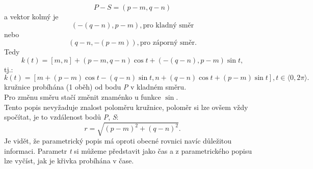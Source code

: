 	$$P-S = (p-m, q-n)$$
	a vektor kolmý je
	$$(-(q-n), p-m), \text{pro kladný směr}$$
	nebo
	$$(q-n, -(p-m)), \text{pro záporný směr}.$$
	Tedy
	$$k(t)=[m, n] + (p-m, q-n)\cos{t} + (-(q-n), p-m)\sin{t}, $$
	tj.:
	$$k(t)=[m + (p-m)\cos{t} - (q-n)\sin{t}, n + (q-n)\cos{t}+(p-m)\sin{t}], t \in \langle0, 2\pi\rangle.$$
	kružnice probíhána (1 oběh) od bodu \textit{P} v kladném směru. \\
	Pro změnu směru stačí změnit znaménko u funkce $\sin$. \\[5pt]
	Tento popis nevyžaduje znalost poloměru kružnice, poloměr si lze ovšem vždy spočítat, je to vzdálenost
	bodů \textit{P}, \textit{S}:
	$$r=\sqrt{(p-m)^2+(q-n)^2}.$$
	Je vidět, že parametrický popis má oproti obecné rovnici navíc důležitou informaci. Parametr \textit{t} si
	můžeme představit jako čas a z parametrického popisu lze vyčíst, jak je křivka probíhána v čase.
	\clearpage
